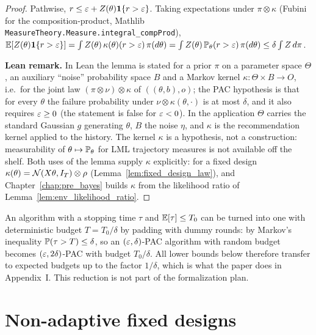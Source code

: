 \begin{proof}
\leanok
{}
Pathwise, $r \le \varepsilon + Z(\theta)\mathbf{1}\{r > \varepsilon\}$. Taking expectations under
$\pi \otimes \kappa$ (Fubini for the composition-product, Mathlib
\texttt{MeasureTheory.Measure.integral\_compProd}),
$\mathbb{E}[Z(\theta)\mathbf{1}\{r>\varepsilon\}] = \int Z(\theta)\,\kappa(\theta)(r > \varepsilon)\,\pi(d\theta)
= \int Z(\theta)\,\mathbb{P}_\theta(r > \varepsilon)\,\pi(d\theta) \le \delta \int Z\,d\pi$.

\textbf{Lean remark.} In Lean the lemma is stated for a prior $\pi$ on a parameter space
$\Theta$, an auxiliary ``noise'' probability space $B$ and a Markov kernel
$\kappa : \Theta\times B \to O$, i.e.\ for the joint law $(\pi\otimes\nu)\otimes\kappa$ of
$((\theta, b), o)$; the PAC hypothesis is that for every $\theta$ the failure probability under
$\nu\otimes\kappa(\theta,\cdot)$ is at most $\delta$, and it also requires $\varepsilon \ge 0$ (the
statement is false for $\varepsilon < 0$). In the application $\Theta$ carries the standard Gaussian
$g$ generating $\theta$, $B$ the noise $\eta$, and $\kappa$ is the recommendation kernel applied
to the history. The kernel $\kappa$ is a hypothesis, not a construction: measurability of
$\theta \mapsto \mathbb{P}_\theta$ for LML trajectory measures is not available off the shelf. Both
uses of the lemma supply $\kappa$ explicitly: for a fixed design
$\kappa(\theta) = \mathcal{N}(X\theta, I_T) \otimes \rho$ (Lemma~\ref{lem:fixed_design_law}), and
Chapter~\ref{chap:pre_bayes} builds $\kappa$ from the likelihood ratio of
Lemma~\ref{lem:env_likelihood_ratio}.
\end{proof}

\begin{remark}\label{rem:stopping_times}
An algorithm with a stopping time $\tau$ and $\mathbb{E}[\tau] \le T_0$ can be turned into one with
deterministic budget $T = T_0/\delta$ by padding with dummy rounds: by Markov's inequality
$\mathbb{P}(\tau > T) \le \delta$, so an $(\varepsilon,\delta)$-PAC algorithm with random budget becomes
$(\varepsilon, 2\delta)$-PAC with budget $T_0/\delta$. All lower bounds below therefore transfer to
expected budgets up to the factor $1/\delta$, which is what the paper does in
Appendix~I. This reduction is not part of the formalization plan.
\end{remark}

\section{Non-adaptive fixed designs}
\label{sec:model_fixed}


